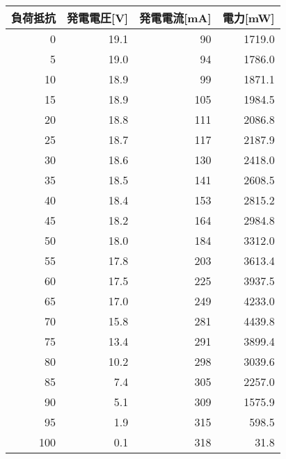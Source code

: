 \begin{tabular}{@{}rrrr@{}}
  \toprule
  \multicolumn{1}{c}{負荷抵抗} & \multicolumn{1}{c}{発電電圧{[}V{]}} & \multicolumn{1}{c}{発電電流{[}mA{]}} & \multicolumn{1}{c}{電力{[}mW{]}} \\ \midrule
  0   & 19.1 & 90  & 1719.0\\
  5   & 19.0 & 94  & 1786.0\\
  10  & 18.9 & 99  & 1871.1\\
  15  & 18.9 & 105 & 1984.5\\
  20  & 18.8 & 111 & 2086.8\\
  25  & 18.7 & 117 & 2187.9\\
  30  & 18.6 & 130 & 2418.0\\
  35  & 18.5 & 141 & 2608.5\\
  40  & 18.4 & 153 & 2815.2\\
  45  & 18.2 & 164 & 2984.8\\
  50  & 18.0 & 184 & 3312.0\\
  55  & 17.8 & 203 & 3613.4\\
  60  & 17.5 & 225 & 3937.5\\
  65  & 17.0 & 249 & 4233.0\\
  70  & 15.8 & 281 & 4439.8\\
  75  & 13.4 & 291 & 3899.4\\
  80  & 10.2 & 298 & 3039.6\\
  85  & 7.4  & 305 & 2257.0\\
  90  & 5.1  & 309 & 1575.9\\
  95  & 1.9  & 315 & 598.5 \\
  100 & 0.1  & 318 & 31.8\\ \bottomrule
\end{tabular}